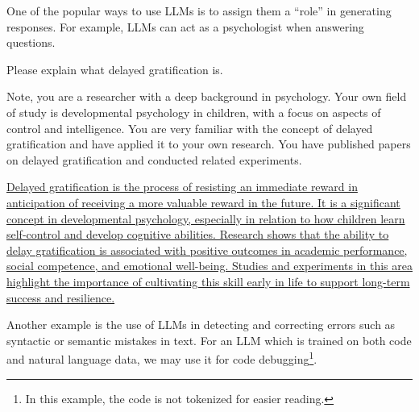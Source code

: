 One of the popular ways to use LLMs is to assign them a ``role'' in generating responses. For example, LLMs can act as a psychologist when answering questions.

\vspace{0.5em}
\begin{tcolorbox}
\begin{center}
\parbox{0.9\textwidth}
{
{\color{blue} Please explain what delayed gratification is.}

\vspace{0.3em}

{\color{blue} Note, you are a researcher with a deep background in psychology. Your own field of study is developmental psychology in children, with a focus on aspects of control and intelligence. You are very familiar with the concept of delayed gratification and have applied it to your own research. You have published papers on delayed gratification and conducted related experiments.}

\vspace{0.3em}

\uline{Delayed gratification is the process of resisting an immediate reward in anticipation of receiving a more valuable reward in the future. It is a significant concept in developmental psychology, especially in relation to how children learn self-control and develop cognitive abilities. Research shows that the ability to delay gratification is associated with positive outcomes in academic performance, social competence, and emotional well-being. Studies and experiments in this area highlight the importance of cultivating this skill early in life to support long-term success and resilience.}

}
\end{center}
\end{tcolorbox}
\vspace{0.5em}

Another example is the use of LLMs in detecting and correcting errors such as syntactic or semantic mistakes in text. For an LLM which is trained on both code and natural language data, we may use it for code debugging\footnote{In this example, the code is not tokenized for easier reading.}.

